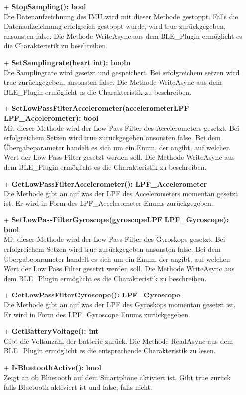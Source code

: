 \documentclass[a4paper,12pt]{article}
\begin{document}
\begin{itemize}
	\item[+] \textbf{StopSampling(): bool}\\Die Datenaufzeichnung des IMU wird mit dieser Methode gestoppt. Falls die Datenaufzeichnung erfolgreich gestoppt wurde, wird true zurückgegeben, ansonsten false. Die Methode WriteAsync aus dem BLE\_Plugin ermöglicht es die Charakteristik zu beschreiben.
	\item[+] \textbf{SetSamplingrate(heart int): booln}\\Die Samplingrate wird gesetzt und gespeichert. Bei erfolgreichem setzen wird true zurückgegeben, ansonsten false. Die Methode WriteAsync aus dem BLE\_Plugin ermöglicht es die Charakteristik zu beschreiben.
	\item[+] \textbf{SetLowPassFilterAccelerometer(accelerometerLPF LPF\_Accelerometer): bool}\\ Mit dieser Methode wird der Low Pass Filter des Accelerometers gesetzt. Bei erfolgreichem Setzen wird true zurückgegeben ansonsten false. Bei dem Übergabeparameter handelt es sich um ein Enum, der angibt, auf welchen Wert der Low Pass Filter gesetzt werden soll. Die Methode WriteAsync aus dem BLE\_Plugin ermöglicht es die Charakteristik zu beschreiben.
	\item[+] \textbf{GetLowPassFilterAccelerometer(): LPF\_Accelerometer}\\ Die Methode gibt an auf was der LPF des Accelerometers momentan gesetzt ist. Er wird in Form des LPF\_Accelerometer Enums zurückgegeben. 
	\item[+] \textbf{SetLowPassFilterGyroscope(gyroscopeLPF LPF\_Gyroscope): bool}\\ Mit dieser Methode wird der Low Pass Filter des Gyroskops gesetzt. Bei erfolgreichem Setzen wird true zurückgegeben ansonsten false. Bei dem Übergabeparameter handelt es sich um ein Enum, der angibt, auf welchen Wert der Low Pass Filter gesetzt werden soll. Die Methode WriteAsync aus dem BLE\_Plugin ermöglicht es die Charakteristik zu beschreiben.
	\item[+] \textbf{GetLowPassFilterGyroscope(): LPF\_Gyroscope}\\Die Methode gibt an auf was der LPF des Gyroskops momentan gesetzt ist. Er wird in Form des LPF\_Gyroscope Enums zurückgegeben. 
	\item[+] \textbf{GetBatteryVoltage(): int}\\ Gibt die Voltanzahl der Batterie zurück. Die Methode ReadAsync aus dem BLE\_Plugin ermöglicht es die entsprechende Charakteristik zu lesen.
	\item[+] \textbf{IsBluetoothActive(): bool}\\ Zeigt an ob Bluetooth auf dem Smartphone aktiviert ist. Gibt true zurück falls Bluetooth aktiviert ist und false, falls nicht.

\end{itemize}
\end{document}
